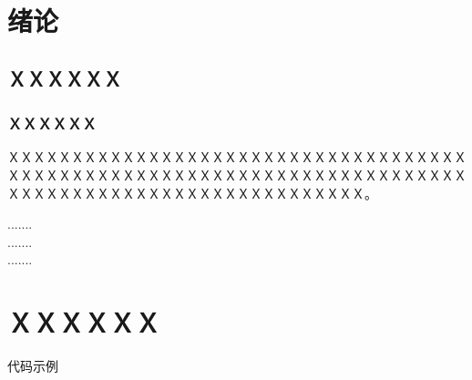 \documentclass[a4paper]{ltxdoc}
\begin{document}
{
\setlength{\cftfignumwidth}{3.5em}
\setlength{\cfttabnumwidth}{3.5em}
\clearpage
\tableofcontents
{}

\clearpage
\listoffigures

\clearpage
\listoftables

}

\fancyhead{}
\pagestyle{fancy}

{
\setcounter{page}{1}
\pretocmd{\section}{\clearpage \vspace*{-2.0em}}{}{}

\setlength{\parindent}{2em}
\setlength{\parskip}{0.5em}
\setlength{\baselineskip}{22pt}

\section{绪论}
\subsection{ＸＸＸＸＸＸ}
\subsubsection{ＸＸＸＸＸＸ}
ＸＸＸＸＸＸＸＸＸＸＸＸＸＸＸＸＸＸＸＸＸＸＸＸＸＸＸＸＸＸＸＸＸＸＸＸＸＸＸＸＸＸＸＸＸＸＸＸＸＸＸＸＸＸＸＸＸＸＸＸＸＸＸＸＸＸＸＸＸＸＸＸＸＸＸＸＸＸＸＸＸＸＸＸＸＸＸＸＸＸＸＸＸＸＸＸＸＸＸＸ。

\begin{center}
	.......\\
	.......\\
	.......
\end{center}

\section{ＸＸＸＸＸＸ}
代码示例
\begin{verbatim}


\end{verbatim}}
\end{document}

